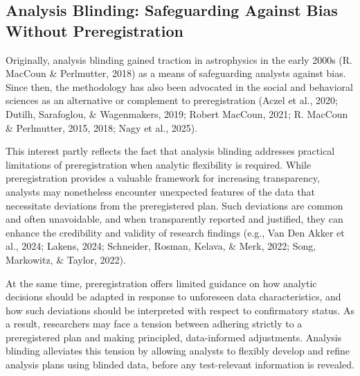 \documentclass[
  english,
  man,floatsintext]{apa6}
\newcounter{none} %
\begin{document}
\subsection{Analysis Blinding: Safeguarding Against Bias Without Preregistration}\label{analysis-blinding-safeguarding-against-bias-without-preregistration}

Originally, analysis blinding gained traction in astrophysics in the early 2000s (R. MacCoun \& Perlmutter, 2018) as a means of safeguarding analysts against bias. Since then, the methodology has also been advocated in the social and behavioral sciences as an alternative or complement to preregistration (Aczel et al., 2020; Dutilh, Sarafoglou, \& Wagenmakers, 2019; Robert MacCoun, 2021; R. MacCoun \& Perlmutter, 2015, 2018; Nagy et al., 2025).

This interest partly reflects the fact that analysis blinding addresses practical limitations of preregistration when analytic flexibility is required. While preregistration provides a valuable framework for increasing transparency, analysts may nonetheless encounter unexpected features of the data that necessitate deviations from the preregistered plan. Such deviations are common and often unavoidable, and when transparently reported and justified, they can enhance the credibility and validity of research findings (e.g., Van Den Akker et al., 2024; Lakens, 2024; Schneider, Rosman, Kelava, \& Merk, 2022; Song, Markowitz, \& Taylor, 2022).

At the same time, preregistration offers limited guidance on how analytic decisions should be adapted in response to unforeseen data characteristics, and how such deviations should be interpreted with respect to confirmatory status. As a result, researchers may face a tension between adhering strictly to a preregistered plan and making principled, data-informed adjustments. Analysis blinding alleviates this tension by allowing analysts to flexibly develop and refine analysis plans using blinded data, before any test-relevant information is revealed.
\end{document}
